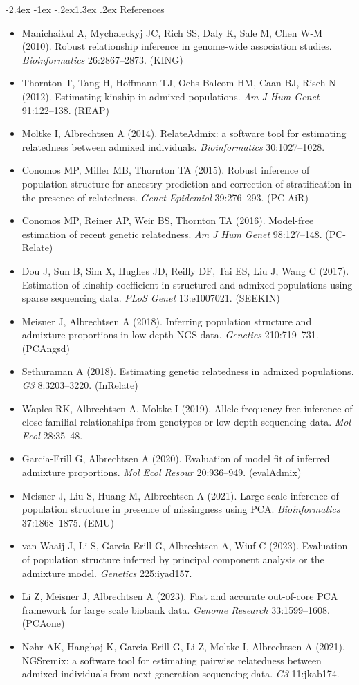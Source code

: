 \documentclass[10pt,a4paper]{article}
\makeatletter
\renewcommand\section{\@startsection{section}{1}{\z@}%
  {-2.4ex \@plus -1ex \@minus -.2ex}{1.3ex \@plus.2ex}%
  {\normalfont\large\bfseries\color{hdr}}}
\newenvironment{tightitem}{%
  \begin{itemize}\setlength{\itemsep}{1pt}\setlength{\parskip}{0pt}%
  \setlength{\topsep}{3pt}\setlength{\parsep}{0pt}}{\end{itemize}}
\makeatother
\begin{document}
\section{References}
\small
\begin{tightitem}
  \item Manichaikul A, Mychaleckyj JC, Rich SS, Daly K, Sale M, Chen W-M (2010). Robust relationship inference in genome-wide association studies. \emph{Bioinformatics} 26:2867--2873. (KING)
  \item Thornton T, Tang H, Hoffmann TJ, Ochs-Balcom HM, Caan BJ, Risch N (2012). Estimating kinship in admixed populations. \emph{Am J Hum Genet} 91:122--138. (REAP)
  \item Moltke I, Albrechtsen A (2014). RelateAdmix: a software tool for estimating relatedness between admixed individuals. \emph{Bioinformatics} 30:1027--1028.
  \item Conomos MP, Miller MB, Thornton TA (2015). Robust inference of population structure for ancestry prediction and correction of stratification in the presence of relatedness. \emph{Genet Epidemiol} 39:276--293. (PC-AiR)
  \item Conomos MP, Reiner AP, Weir BS, Thornton TA (2016). Model-free estimation of recent genetic relatedness. \emph{Am J Hum Genet} 98:127--148. (PC-Relate)
  \item Dou J, Sun B, Sim X, Hughes JD, Reilly DF, Tai ES, Liu J, Wang C (2017). Estimation of kinship coefficient in structured and admixed populations using sparse sequencing data. \emph{PLoS Genet} 13:e1007021. (SEEKIN)
  \item Meisner J, Albrechtsen A (2018). Inferring population structure and admixture proportions in low-depth NGS data. \emph{Genetics} 210:719--731. (PCAngsd)
  \item Sethuraman A (2018). Estimating genetic relatedness in admixed populations. \emph{G3} 8:3203--3220. (InRelate)
  \item Waples RK, Albrechtsen A, Moltke I (2019). Allele frequency-free inference of close familial relationships from genotypes or low-depth sequencing data. \emph{Mol Ecol} 28:35--48.
  \item Garcia-Erill G, Albrechtsen A (2020). Evaluation of model fit of inferred admixture proportions. \emph{Mol Ecol Resour} 20:936--949. (evalAdmix)
  \item Meisner J, Liu S, Huang M, Albrechtsen A (2021). Large-scale inference of population structure in presence of missingness using PCA. \emph{Bioinformatics} 37:1868--1875. (EMU)
  \item van Waaij J, Li S, Garcia-Erill G, Albrechtsen A, Wiuf C (2023). Evaluation of population structure inferred by principal component analysis or the admixture model. \emph{Genetics} 225:iyad157.
  \item Li Z, Meisner J, Albrechtsen A (2023). Fast and accurate out-of-core PCA framework for large scale biobank data. \emph{Genome Research} 33:1599--1608. (PCAone)
  \item N\o hr AK, Hangh\o j K, Garcia-Erill G, Li Z, Moltke I, Albrechtsen A (2021). NGSremix: a software tool for estimating pairwise relatedness between admixed individuals from next-generation sequencing data. \emph{G3} 11:jkab174.
\end{tightitem}
\end{document}

